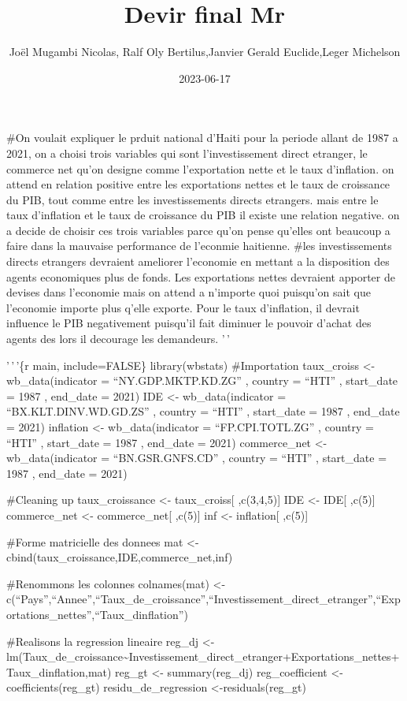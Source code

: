 \documentclass[
]{article}
\title{Devir final Mr}
\author{Joël Mugambi Nicolas, Ralf Oly Bertilus,Janvier Gerald
Euclide,Leger Michelson}
\date{2023-06-17}
\begin{document}
\maketitle

\#On voulait expliquer le prduit national d'Haiti pour la periode allant
de 1987 a 2021, on a choisi trois variables qui sont l'investissement
direct etranger, le commerce net qu'on designe comme l'exportation nette
et le taux d'inflation. on attend en relation positive entre les
exportations nettes et le taux de croissance du PIB, tout comme entre
les investissements directs etrangers. mais entre le taux d'inflation et
le taux de croissance du PIB il existe une relation negative. on a
decide de choisir ces trois variables parce qu'on pense qu'elles ont
beaucoup a faire dans la mauvaise performance de l'econmie haitienne.
\#les investissements directs etrangers devraient ameliorer l'economie
en mettant a la disposition des agents economiques plus de fonds. Les
exportations nettes devraient apporter de devises dans l'economie mais
on attend a n'importe quoi puisqu'on sait que l'economie importe plus
q'elle exporte. Pour le taux d'inflation, il devrait influence le PIB
negativement puisqu'il fait diminuer le pouvoir d'achat des agents des
lors il decourage les demandeurs. '\,'

'\,'\,'\{r main, include=FALSE\} library(wbstats) \#Importation
taux\_croiss \textless- wb\_data(indicator = ``NY.GDP.MKTP.KD.ZG'' ,
country = ``HTI'' , start\_date = 1987 , end\_date = 2021) IDE
\textless- wb\_data(indicator = ``BX.KLT.DINV.WD.GD.ZS'' , country =
``HTI'' , start\_date = 1987 , end\_date = 2021) inflation \textless-
wb\_data(indicator = ``FP.CPI.TOTL.ZG'' , country = ``HTI'' ,
start\_date = 1987 , end\_date = 2021) commerce\_net \textless-
wb\_data(indicator = ``BN.GSR.GNFS.CD'' , country = ``HTI'' ,
start\_date = 1987 , end\_date = 2021)

\#Cleaning up taux\_croissance \textless- taux\_croiss{[} ,c(3,4,5){]}
IDE \textless- IDE{[} ,c(5){]} commerce\_net \textless- commerce\_net{[}
,c(5){]} inf \textless- inflation{[} ,c(5){]}

\#Forme matricielle des donnees mat \textless-
cbind(taux\_croissance,IDE,commerce\_net,inf)

\#Renommons les colonnes colnames(mat) \textless-
c(``Pays'',``Annee'',``Taux\_de\_croissance'',``Investissement\_direct\_etranger'',``Exportations\_nettes'',``Taux\_dinflation'')

\#Realisons la regression lineaire reg\_dj \textless-
lm(Taux\_de\_croissance\textasciitilde Investissement\_direct\_etranger+Exportations\_nettes+Taux\_dinflation,mat)
reg\_gt \textless- summary(reg\_dj) reg\_coefficient
\textless-coefficients(reg\_gt) residu\_de\_regression
\textless-residuals(reg\_gt)
\end{document}
